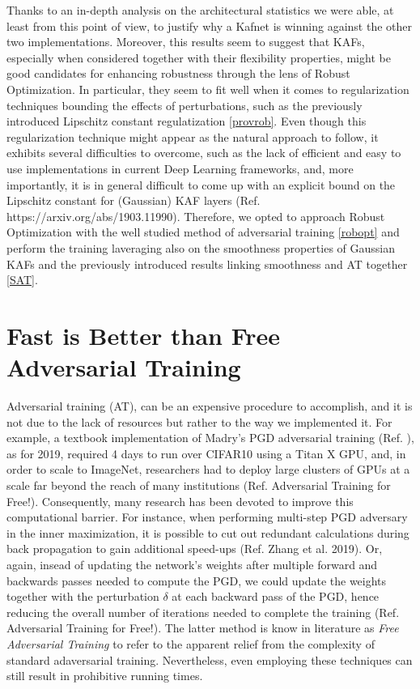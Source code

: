 \documentclass[LaM,binding=0.6cm]{./packages/sapthesis/sapthesis}
\begin{document}
        Thanks to an in-depth analysis on the architectural statistics we were able, at least from this point of view, to justify why a Kafnet is winning 
        against the other two implementations. Moreover, this results seem to suggest that KAFs, especially when considered together with their flexibility 
        properties, might be good candidates for enhancing robustness through the lens of Robust Optimization. In particular, they seem to fit well when it 
        comes to regularization techniques bounding the effects of perturbations, such as the previously introduced Lipschitz constant regulatization \ref{provrob}.
        Even though this regularization technique might appear as the natural approach to follow, it exhibits several difficulties to overcome, such as the lack 
        of efficient and easy to use implementations in current Deep Learning frameworks, and, more importantly, it is in general difficult to come up with an explicit bound 
        on the Lipschitz constant for (Gaussian) KAF layers (Ref. https://arxiv.org/abs/1903.11990). Therefore, we opted to approach Robust Optimization with 
        the well studied method of adversarial training \ref{robopt} and perform the training laveraging also on the smoothness properties of Gaussian KAFs 
        and the previously introduced results linking smoothness and AT together \ref{SAT}.  

    \section{Fast is Better than Free Adversarial Training}
    \label{fbf}
        Adversarial training (AT), can be an expensive procedure to accomplish, and it is not due to the lack of resources but rather to the way we
        implemented it. For example, a textbook implementation of Madry's PGD adversarial training (Ref. ), as for 2019, required 4 days to run over 
        CIFAR10 using a Titan X GPU, and, in order to scale to ImageNet, researchers had to deploy large clusters of GPUs at a scale far beyond the reach of many 
        institutions (Ref. Adversarial Training for Free!). Consequently, many research has been devoted to improve this computational barrier. For 
        instance, when performing multi-step PGD adversary in the inner maximization, it is possible to cut out redundant calculations during back 
        propagation to gain additional speed-ups (Ref. Zhang et al. 2019). Or, again, insead of updating the network's weights after multiple 
        forward and backwards passes needed to compute the PGD, we could update the weights together with the perturbation $\delta$ at each 
        backward pass of the PGD, hence reducing the overall number of iterations needed to complete the training (Ref. Adversarial Training for Free!).
        The latter method is know in literature as \textit{Free Adversarial Training} to refer to the apparent relief from the complexity of standard adaversarial
        training.
        Nevertheless, even employing these techniques can still result in prohibitive running times.
        
\end{document}
